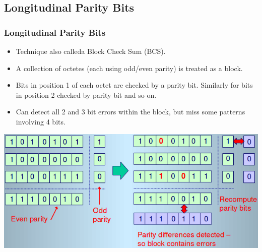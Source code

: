 \documentclass{beamer}
\begin{document}
\subsection{Longitudinal Parity Bits}
\begin{frame}
\frametitle{Longitudinal Parity Bits}
\begin{itemize}
\item Technique also calleda Block Check Sum (BCS).
\item A collection of octetes (each using odd/even parity) is treated as a block.
\item Bits in position 1 of each octet are checked by a parity bit. Similarly for bits in position 2 checked by parity bit and so on.
\item Can detect all 2 and 3 bit errors within the block, but miss some patterns involving 4 bits.
\end{itemize}
\includegraphics[scale=0.3]{lpb.png}
\end{frame}
\end{document}

